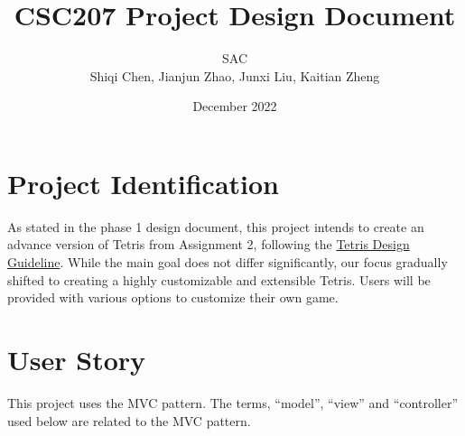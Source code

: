 \documentclass{article}
\title{CSC207 Project Design Document}
\author{SAC \\ Shiqi Chen, Jianjun Zhao, Junxi Liu, Kaitian Zheng}
\date{December 2022}
\begin{document}
\maketitle


\section{Project Identification}

As stated in the phase 1 design document, this project intends to create an advance version of Tetris from Assignment 2, following the \href{https://tetris.wiki/Tetris_Guideline}{Tetris Design Guideline}. While the main goal does not differ significantly, our focus gradually shifted to creating a highly customizable and extensible Tetris. Users will be provided with various options to customize their own game.

\section{User Story}
This project uses the MVC pattern. The terms, ``model'', ``view'' and ``controller'' used below are related to the MVC pattern.
\end{document}
